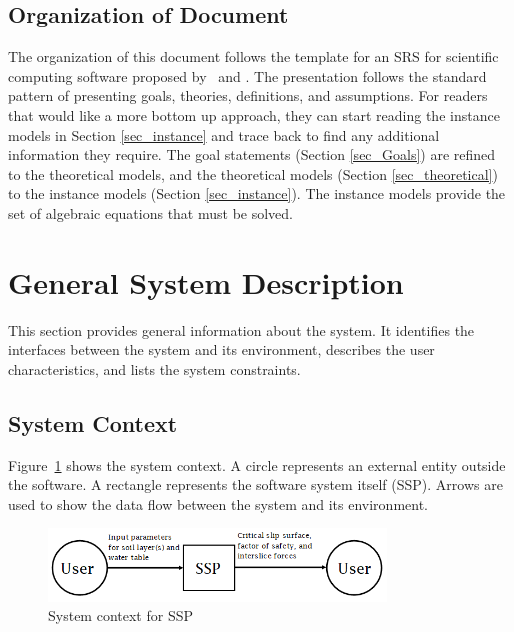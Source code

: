 \documentclass[12pt]{article}
\newcommand{\progname}{SSP}
\begin{document}
\subsection{Organization of Document}

The organization of this document follows the template for an SRS for
scientific computing software proposed by~\cite{Koothoor2013} and
\cite{SmithAndLai2005}.  The presentation follows the standard pattern
of presenting goals, theories, definitions, and assumptions.  For
readers that would like a more bottom up approach, they can start
reading the instance models in Section \ref{sec_instance} and trace
back to find any additional information they require. The goal statements 
(Section \ref{sec_Goals}) are refined to the theoretical models, and the 
theoretical models (Section \ref{sec_theoretical}) to the instance models 
(Section \ref{sec_instance}). The instance models provide the set of algebraic 
equations that must be solved.


\section{General System Description}

This section provides general information about the system. It identifies the 
interfaces between the system and its environment, describes the user 
characteristics, and lists the system constraints.

\subsection{System Context}

Figure~\ref{Fig_SystemContext} shows the system context.  A circle represents an
external entity outside the software.  A rectangle represents the software 
system itself (\progname).  Arrows are used to show the data flow between the 
system and its environment.

\begin{figure}[h!]
	\begin{center}
		\includegraphics[width=0.8\textwidth]{SystemContextFigure.png}
		\caption{System context for \progname{}}
		\label{Fig_SystemContext}
	\end{center}
\end{figure}
\end{document}
